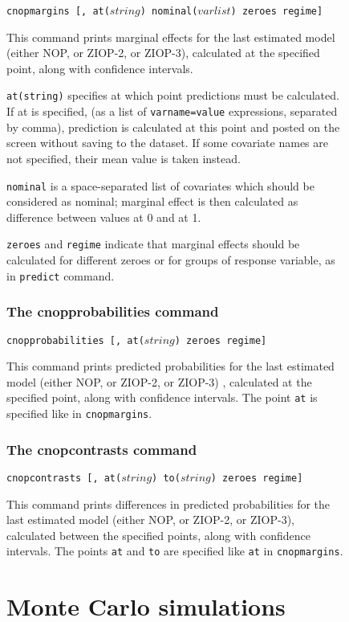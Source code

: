 \documentclass[letterpaper,fleqn,12pt]{article}
\begin{document}
\begin{figure}[H]
\begin{onehalfspace}
\texttt{cnopmargins [, at($string$) nominal($varlist$) zeroes regime]}

This command prints marginal effects for the last estimated model (either
NOP, or ZIOP-2, or ZIOP-3), calculated at the specified point, along with
confidence intervals.

\texttt{at(string)} specifies at which point predictions must be calculated.
If at is specified, (as a list of \texttt{varname=value} expressions,
separated by comma), prediction is calculated at this point and posted on
the screen without saving to the dataset. If some covariate names are not
specified, their mean value is taken instead.

\texttt{nominal} is a space-separated list of covariates which should be
considered as nominal; marginal effect is then calculated as difference
between values at 0 and at 1.

\texttt{zeroes} and \texttt{regime} indicate that marginal effects should be
calculated for different zeroes or for groups of response variable, as in 
\texttt{predict} command.

\subsubsection*{The cnopprobabilities command}

\texttt{cnopprobabilities [, at($string$) zeroes regime]}

This command prints predicted probabilities for the last estimated model
(either NOP, or ZIOP-2, or ZIOP-3) , calculated at the specified point,
along with confidence intervals. The point \texttt{at} is specified like in 
\texttt{cnopmargins}.

\subsubsection*{The cnopcontrasts command}

\texttt{cnopcontrasts [, at($string$) to($string$) zeroes regime] }

This command prints differences in predicted probabilities for the last
estimated model (either NOP, or ZIOP-2, or ZIOP-3), calculated between the
specified points, along with confidence intervals. The points \texttt{at}
and \texttt{to} are specified like \texttt{at} in \texttt{cnopmargins}.

\section{Monte Carlo simulations}


\end{onehalfspace}
\end{figure}
\end{document}
